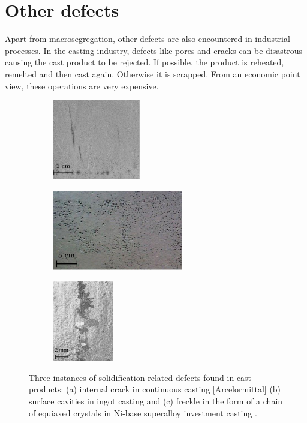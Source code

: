 \section{Other defects}

Apart from macrosegregation, other defects are also encountered in industrial processes. 
In the casting industry, defects like pores and cracks can be disastrous causing the cast product 
to be rejected. If possible, the product is reheated, remelted and then cast again. Otherwise it is scrapped.
From an economic point view, these operations are very expensive.

%
\begin{figure}[htbp]
\centering
  \begin{subfigure}[t]{0.3\textwidth}
    \centering
	\includegraphics[height=3.5cm]{Chapter1/Graphics/cracks.pdf}
	\caption{}
    \label{fig:crack}
  \end{subfigure}
   \begin{subfigure}[t]{0.35\textwidth}
    \centering
	\includegraphics[height=3.5cm]{Chapter1/Graphics/porosity.pdf}
	\caption{}
    \label{fig:porosity}
  \end{subfigure}
   \begin{subfigure}[t]{0.3\textwidth}
    \centering
	\includegraphics[height=3.5cm]{Chapter1/Graphics/freckle.pdf} 
	\caption{}
    \label{fig:freckle}
  \end{subfigure}
\caption{Three instances of solidification-related defects found in cast products: 
(a) internal crack in continuous casting [Arcelormittal] (b) surface cavities in ingot casting \citep{carlson_modeling_2002}  
and (c) freckle in the form of a chain of equiaxed crystals in Ni-base superalloy investment casting \citep{giamei_nature_1970}.}
\label{fig:casting}
\end{figure}

